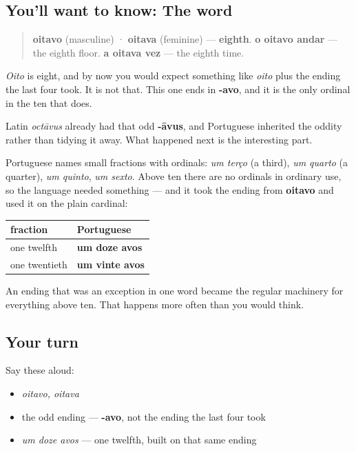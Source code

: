 \subsection*{You'll want to know: The word}
\begin{quote}
\textbf{oitavo} (masculine) · \textbf{oitava} (feminine) — \textbf{eighth}. \textbf{o oitavo andar} — the eighth floor. \textbf{a oitava vez} — the eighth time.
\end{quote}

\emph{Oito} is eight, and by now you would expect something like \emph{oito} plus the ending the last four took. It is not that. This one ends in \textbf{-avo}, and it is the only ordinal in the ten that does.

\begin{grammarlens}[title={Grammar Lens: the ending got a second job}]
Latin \emph{octāvus} already had that odd \textbf{-āvus}, and Portuguese inherited the oddity rather than tidying it away. What happened next is the interesting part.

Portuguese names small fractions with ordinals: \emph{um terço} (a third), \emph{um quarto} (a quarter), \emph{um quinto}, \emph{um sexto}. Above ten there are no ordinals in ordinary use, so the language needed something — and it took the ending from \textbf{oitavo} and used it on the plain cardinal:

\noindent
\begin{tabularx}{\linewidth}{@{}>{\raggedright\arraybackslash}X>{\raggedright\arraybackslash}X@{}}
\toprule
\textbf{fraction} & \textbf{Portuguese} \\
\midrule
one twelfth & \textbf{um doze avos} \\
one twentieth & \textbf{um vinte avos} \\
\bottomrule
\end{tabularx}

An ending that was an exception in one word became the regular machinery for everything above ten. That happens more often than you would think.
\end{grammarlens}

\subsection*{Your turn}
Say these aloud:

\begin{itemize}
\raggedright
  \item \emph{oitavo, oitava}
  \item the odd ending — \textbf{-avo}, not the ending the last four took
  \item \emph{um doze avos} — one twelfth, built on that same ending
\end{itemize}

